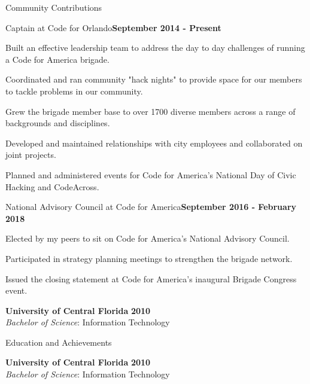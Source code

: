 \documentclass{resume} %
\begin{document}
\begin{rSection}{Community Contributions}

\begin{rSubsection}{Captain at Code for Orlando}{\bf September 2014 - Present}{}{}

\item Built an effective leadership team to address the day to day challenges of running a Code for America brigade.
\item Coordinated and ran community "hack nights" to provide space for our members to tackle problems in our community.
\item Grew the brigade member base to over 1700 diverse members across a range of backgrounds and disciplines.
\item Developed and maintained relationships with city employees and collaborated on joint projects.
\item Planned and administered events for Code for America's National Day of Civic Hacking and CodeAcross.


\end{rSubsection}

\begin{rSubsection}{National Advisory Council at Code for America}{\bf September 2016 - February 2018}{}{}

\item Elected by my peers to sit on Code for America's National Advisory Council.
\item Participated in strategy planning meetings to strengthen the brigade network.
\item Issued the closing statement at Code for America's inaugural Brigade Congress event.


\end{rSubsection}

{\bf University of Central Florida} \hfill {\bf 2010} \\ 
{\it Bachelor of Science}: Information Technology \\
\end{rSection}


\begin{rSection}{Education and Achievements}

{\bf University of Central Florida} \hfill {\bf 2010} \\ 
{\it Bachelor of Science}: Information Technology \\
\end{rSection}
\end{document}

